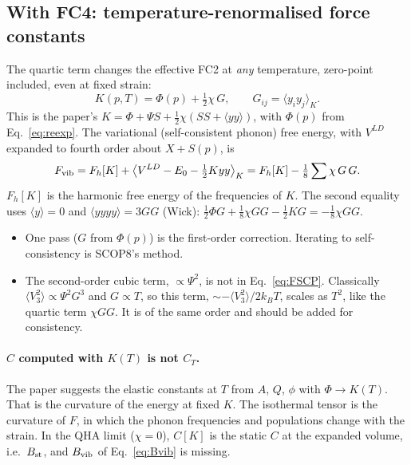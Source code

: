 \documentclass[11pt,a4paper]{article}
\begin{document}
\subsection{With FC4: temperature-renormalised force constants}
The quartic term changes the effective FC2 at \emph{any} temperature, zero-point included, even at
fixed strain:
\begin{equation}
K(p,T)=\Phi(p)+\tfrac12\chi\,G,\qquad G_{ij}=\langle y_iy_j\rangle_K .
\label{eq:K}
\end{equation}
This is the paper's $K=\Phi+\Psi S+\tfrac12\chi(SS+\langle yy\rangle)$, with $\Phi(p)$ from Eq.~\eqref{eq:reexp}. The
variational (self-consistent phonon) free energy, with $V^{LD}$ expanded to fourth order about $X+S(p)$, is
\begin{equation}
F_{\rm vib}=F_h[K]+\big\langle V^{LD}-E_0-\tfrac12Kyy\big\rangle_K=F_h[K]-\tfrac18\sum\chi\,G\,G .
\label{eq:FSCP}
\end{equation}
$F_h[K]$ is the harmonic free energy of the frequencies of $K$. The second equality uses $\langle y\rangle=0$
and $\langle yyyy\rangle=3GG$ (Wick): $\tfrac12\Phi G+\tfrac18\chi GG-\tfrac12KG=-\tfrac18\chi GG$.
\begin{itemize}
\item One pass ($G$ from $\Phi(p)$) is the first-order correction. Iterating to self-consistency is SCOP8's method.
\item The second-order cubic term, $\propto\Psi^2$, is not in Eq.~\eqref{eq:FSCP}. Classically
  $\langle V_3^2\rangle\propto\Psi^2G^3$ and $G\propto T$, so this term, $\sim-\langle V_3^2\rangle/2k_BT$, scales as
  $T^2$, like the quartic term $\chi GG$. It is of the same order and should be added for consistency.
\end{itemize}

\paragraph{$C$ computed with $K(T)$ is not $C_T$.} The paper suggests the elastic constants at $T$ from
$A$, $Q$, $\phi$ with $\Phi\to K(T)$. That is the curvature of the energy at fixed $K$. The isothermal tensor
is the curvature of $F$, in which the phonon frequencies and populations change with the strain. In the
QHA limit ($\chi=0$), $C[K]$ is the static $C$ at the expanded volume, i.e.\ $B_{\rm st}$, and $B_{\rm vib}$ of
Eq.~\eqref{eq:Bvib} is missing.
\end{document}
